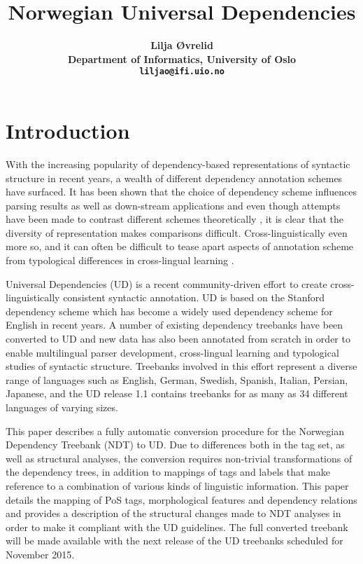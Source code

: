 \documentclass[11pt,a4paper]{article}
\title{Norwegian Universal Dependencies}
\author{\bf Lilja {\O}vrelid\\[0.2ex]
         \mbox{}Department of Informatics, University of Oslo\\[0.2ex]
         \mbox{}{\tt liljao@ifi.uio.no}\\[0.2ex]
        \vspace*{1.5ex}}
\date{}
\begin{document}
\maketitle

\section{Introduction}
With the increasing popularity of dependency-based representations of
syntactic structure in recent years, a wealth of different dependency
annotation schemes have surfaced. It has been shown that the choice of
dependency scheme influences parsing results \cite{Sch:Abe:Rap:12} as
well as down-stream applications \cite{Elm:Joh:Kle:13} and even though
attempts have been made to contrast different schemes theoretically
\cite{Iva:Oep:Ovr:12}, it is clear that the diversity of
representation makes comparisons difficult. Cross-linguistically even
more so, and it can often be difficult to tease apart
aspects of annotation scheme from typological differences in cross-lingual learning \cite{Soe:11,Skj:Ovr:12}.

Universal Dependencies (UD) \cite{Mar:Doz:Sil:14,Nivre:15} is a recent
community-driven effort to create cross-linguistically consistent
syntactic annotation. UD is based on the Stanford dependency scheme
\cite{Mar:Mac:Man:06} which has become a widely used dependency scheme
for English in recent years.  A number of existing dependency
treebanks have been converted to UD \cite{Pyy:Kan:Miss:15,Nivre:14}
and new data has also been annotated from scratch in order to enable
multilingual parser development, cross-lingual learning and
typological studies of syntactic structure. Treebanks involved in this
effort represent a diverse range of languages such as English, German,
Swedish, Spanish, Italian, Persian, Japanese, and the UD release 1.1
contains treebanks for as many as 34 different languages of varying
sizes. 

This paper describes a fully automatic conversion procedure for the
Norwegian Dependency Treebank (NDT) to UD. Due to differences both in
the tag set, as well as structural analyses, the conversion requires
non-trivial transformations of the dependency trees, in addition to
mappings of tags and labels that make reference to a combination of
various kinds of linguistic information.  This paper details the
mapping of PoS tags, morphological features and dependency relations
and provides a description of the structural changes made to NDT
analyses in order to make it compliant with the UD guidelines. The full
converted treebank will be made available with the next release of the
UD treebanks scheduled for November 2015.
\end{document}
